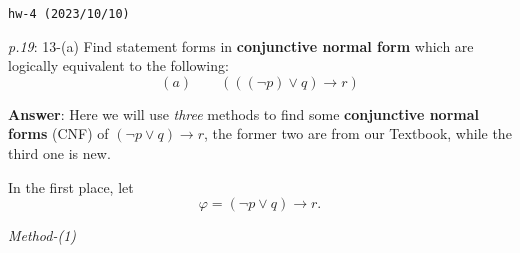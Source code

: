 \documentclass[UTF8,12pt,a4paper]{ctexart}
\begin{document}
\noindent\texttt{hw-4 (2023/10/10)}

\emph{p.19}: 13-(a) \quad
Find statement forms in \textbf{conjunctive normal form} which are logically equivalent to the following:
\[
(a) \qquad (((\neg p)  \lor q) \to r)
\] 

\noindent\textbf{Answer}: 
Here we will use \textit{three} methods to find some \textbf{conjunctive normal forms} (CNF) of $(\neg p \lor q) \to r$, the former two are from our \textsf{Textbook}, while the third one is new.

In the first place, let 
\[
\varphi = (\neg p \lor q) \to r.
\]

\noindent\textit{Method-(1)}
\end{document}
